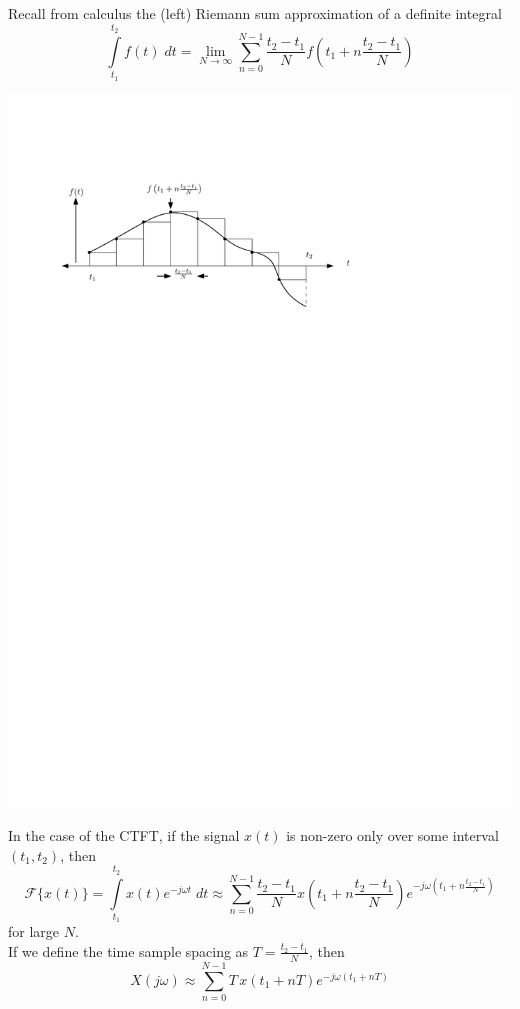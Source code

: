 Recall from calculus the (left) Riemann sum approximation of a definite integral
\[
\int\limits_{t_1}^{t_2} f(t) \; dt = \lim_{N \rightarrow \infty} \sum_{n = 0}^{N-1} \frac{t_2-t_1}{N} f\left(t_1 + n\frac{t_2-t_1}{N}\right) 
\]
\begin{center}
  \includegraphics[scale=0.9]{graphics/riemann_sum.pdf}
\end{center}
In the case of the CTFT, if the signal $x(t)$ is non-zero only over some interval $(t_1, t_2)$, then
\[
\mathcal{F}\{ x(t) \} = \int\limits_{t_1}^{t_2} x(t) e^{-j\omega t} \; dt \approx \sum_{n = 0}^{N-1} \frac{t_2-t_1}{N} x\left(t_1 + n\frac{t_2-t_1}{N}\right) e^{-j\omega \left(t_1 + n\frac{t_2-t_1}{N}\right)} 
\]
for large $N$.\\[1em]

If we define the time sample spacing as $T = \frac{t_2-t_1}{N}$, then
\[
X(j\omega) \approx \sum_{n = 0}^{N-1} T \, x\left(t_1 + nT\right) e^{-j\omega \left(t_1 + nT\right)}
\]

